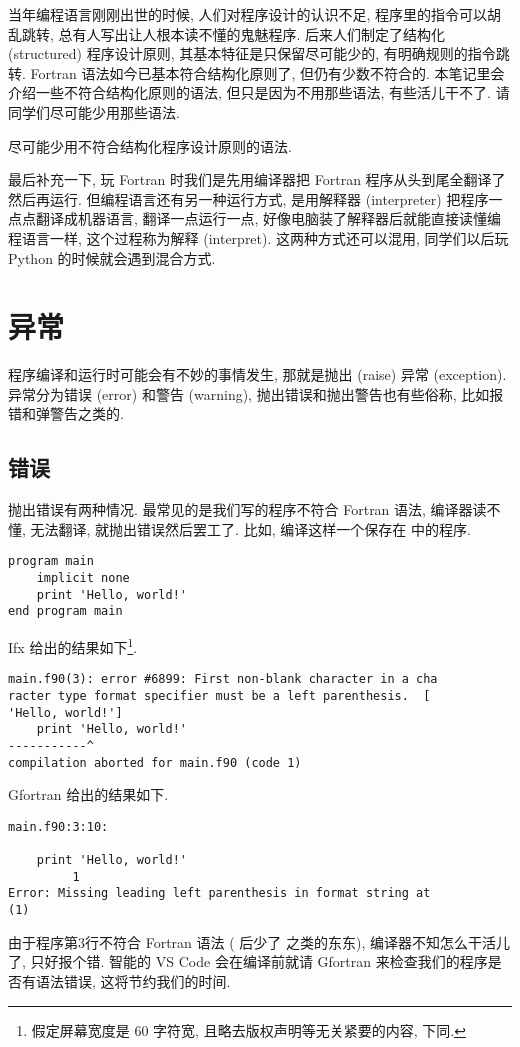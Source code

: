 当年编程语言刚刚出世的时候, 人们对程序设计的认识不足, 程序里的指令可以胡乱跳转, 总有人写出让人根本读不懂的鬼魅程序. 后来人们制定了结构化 (structured) 程序设计原则, 其基本特征是只保留尽可能少的, 有明确规则的指令跳转. Fortran 语法如今已基本符合结构化原则了, 但仍有少数不符合的. 本笔记里会介绍一些不符合结构化原则的语法, 但只是因为不用那些语法, 有些活儿干不了. 请同学们尽可能少用那些语法.
\begin{convention}
    尽可能少用不符合结构化程序设计原则的语法.\label{no_no_structured}
\end{convention}

最后补充一下, 玩 Fortran 时我们是先用编译器把 Fortran 程序从头到尾全翻译了然后再运行. 但编程语言还有另一种运行方式, 是用解释器 (interpreter) 把程序一点点翻译成机器语言, 翻译一点运行一点, 好像电脑装了解释器后就能直接读懂编程语言一样, 这个过程称为解释 (interpret). 这两种方式还可以混用, 同学们以后玩 Python 的时候就会遇到混合方式.

\section{异常}\label{fortran_exception}

程序编译和运行时可能会有不妙的事情发生, 那就是抛出 (raise) 异常 (exception). 异常分为错误 (error) 和警告 (warning), 抛出错误和抛出警告也有些俗称, 比如报错和弹警告之类的.

\subsection{错误}\label{fortran_error}

抛出错误有两种情况. 最常见的是我们写的程序不符合 Fortran 语法, 编译器读不懂, 无法翻译, 就抛出错误然后罢工了. 比如, 编译这样一个保存在  中的程序.
\begin{lstlisting}
program main
    implicit none
    print 'Hello, world!'
end program main
\end{lstlisting}
Ifx 给出的结果如下\footnote{
    假定屏幕宽度是 60 字符宽, 且略去版权声明等无关紧要的内容, 下同.
}.
\begin{verbatim}
main.f90(3): error #6899: First non-blank character in a cha
racter type format specifier must be a left parenthesis.  [
'Hello, world!']
    print 'Hello, world!'
-----------^
compilation aborted for main.f90 (code 1)
\end{verbatim}
Gfortran 给出的结果如下.
\begin{verbatim}
main.f90:3:10:

    print 'Hello, world!'
         1
Error: Missing leading left parenthesis in format string at 
(1)
\end{verbatim}
由于程序第3行不符合 Fortran 语法 ( 后少了 \ttt{*,} 之类的东东), 编译器不知怎么干活儿了, 只好报个错. 智能的 VS Code 会在编译前就请 Gfortran 来检查我们的程序是否有语法错误, 这将节约我们的时间.

